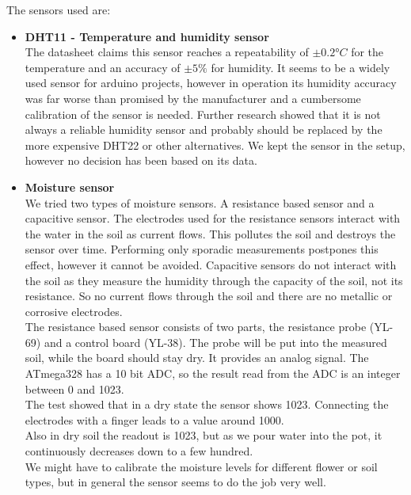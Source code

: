 The sensors used are:
\begin{itemize}

\item \textbf{DHT11 - Temperature and humidity sensor}\\
The datasheet claims this sensor reaches a repeatability of $\pm0.2°C$ for the temperature and an accuracy of $\pm 5\%$ for humidity. It seems to be a widely used sensor for arduino projects, however in operation its humidity accuracy was far worse than promised by the manufacturer and a cumbersome calibration of the sensor is needed. Further research showed that it is not always a reliable humidity sensor and probably should be replaced by the more expensive DHT22 or other alternatives. We kept the sensor in the setup, however no decision has been based on its data.

\item \textbf{Moisture sensor}\\
We tried two types of moisture sensors. A resistance based sensor and a capacitive sensor. The electrodes used for the resistance sensors interact with the water in the soil as current flows. This pollutes the soil and destroys the sensor over time. Performing only sporadic measurements postpones this effect, however it cannot be avoided. Capacitive sensors do not interact with the soil as they measure the humidity through the capacity of the soil, not its resistance. So no current flows through the soil and there are no metallic or corrosive electrodes.\\

The resistance based sensor consists of two parts, the resistance probe (YL-69) and a control board (YL-38). The probe will be put into the measured soil, while the board should stay dry. It provides an analog signal. The ATmega328 has a 10 bit ADC, so the result read from the ADC is an integer between 0 and 1023.\\

The test showed that in a dry state the sensor shows 1023. Connecting the electrodes with a finger leads to a value around 1000.\\
Also in dry soil the readout is 1023, but as we pour water into the pot, it continuously decreases down to a few hundred.\\

We might have to calibrate the moisture levels for different flower or soil types, but in general the sensor seems to do the job very well.\\


\end{itemize}
